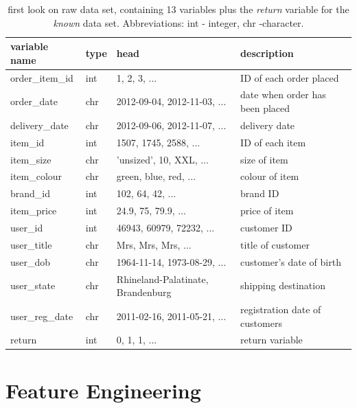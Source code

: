 \documentclass[a4paper,12pt]{article}
\begin{document}
\begin{table}[h]
\begin{center}
 \begin{tabular}{l | l  l | l}
 variable name & type & head & description\\
 \hline
 order\_item\_id & int & 1, 2, 3, ...               & ID of each order placed\\
 order\_date    & chr & 2012-09-04, 2012-11-03, ... & date when order has been placed \\
 delivery\_date & chr & 2012-09-06, 2012-11-07, ... & delivery date \\
 item\_id       & int & 1507, 1745, 2588, ...       & ID of each item \\
 item\_size     & chr & 'unsized', 10, XXL, ...     & size of item\\
 item\_colour   & chr & green, blue, red, ...       & colour of item\\
 brand\_id      & int & 102, 64, 42, ...            & brand ID\\
 item\_price    & int & 24.9, 75, 79.9, ...         & price of item\\
 user\_id       & int & 46943, 60979, 72232, ...    & customer ID\\
 user\_title    & chr & Mrs, Mrs, Mrs, ...          & title of customer \\
 user\_dob      & chr & 1964-11-14, 1973-08-29, ... & customer's date of birth\\
 user\_state    & chr & Rhineland-Palatinate, Brandenburg & shipping destination\\
 user\_reg\_date & chr & 2011-02-16, 2011-05-21, ...& registration date of customers \\
 \hline
 return        & int & 0, 1, 1, ...                 & return variable
 \end{tabular}
\end{center}
\caption{first look on raw data set, containing 13 variables plus the \textit{return} variable for the \textit{known} data set. Abbreviations: int - integer, chr -character.}
\label{raw data set}
\end{table}



 \section{Feature Engineering}
\end{document}
